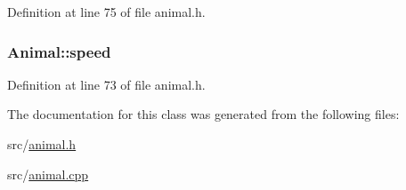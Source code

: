 Definition at line 75 of file animal.\-h.

\hypertarget{class_animal_a280335c5deaf3402c85ab95a7653a483}{
\subsubsection[{speed}]{ Animal\-::speed\hspace{0.3cm}{\ttfamily [protected]}}}\label{class_animal_a280335c5deaf3402c85ab95a7653a483}


Definition at line 73 of file animal.\-h.



The documentation for this class was generated from the following files\-:\begin{DoxyCompactItemize}
\item 
src/\hyperlink{animal_8h}{animal.\-h}\item 
src/\hyperlink{animal_8cpp}{animal.\-cpp}\end{DoxyCompactItemize}
